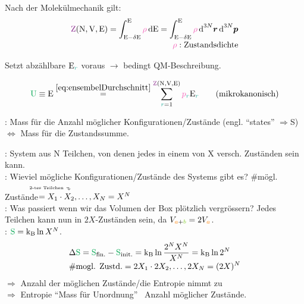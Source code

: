 \begin{emphbox}\nospacing
  \begin{law}
    Nach der Molekülmechanik gilt:
    \begin{align}
      \Zzm=\int_{\Ez-\delta\Ez}^{\Ez}\rhoc\diff\Ez=\int_{\Ez-\delta\Ez}^{\Ez}\rhoc\diff^{3N}\vec{r}\diff^{3N}\vec{p}\nalign
      \rhoc:\text{Zustandsdichte} \nonumber
    \end{align}
  \end{law}
\end{emphbox}
\begin{sectionbox}\nospacing
  \begin{numberlist}
      \item
  \begin{notebox}[Bemerkung]
    Setzt abzählbare $\Ezr$ voraus $\rightarrow$ bedingt QM-Beschreibung.
  \end{notebox}
  \begin{equation}
		\Upot\equiv\Ez\eqs{\cref{eq:ensembelDurchschnitt}}\sum_{\idxr=1}^{\Zzm}\pbr\Ezr\qquad(\text{mikrokanonisch})
  \end{equation}
    \item {}: Mass für die Anzahl möglicher Konfigurationen/Zustände (engl. ``states''
  $\Rightarrow$S) $\Leftrightarrow$ Mass für die Zustandssumme.
  \end{numberlist}
\end{sectionbox}
\begin{notebox}[Beispiel]\nospacing
  : System aus N Teilchen, von denen jedes in einem von X versch. Zuständen sein kann.\\
  : Wieviel mögliche Konfigurationen/Zustände des Systems gibt es? \#mögl. Zustände$=X_1\cdot\tdla{X_2}{\normalfont{2-tes Teilchen}},\ldots,X_N=X^N$\\
  : Was passiert wenn wir das Volumen der Box plötzlich vergrössern?
  Jedes Teilchen kann nun in $2X$-Zuständen sein, da $V_{\mca+\mcb}=2V_{\mca}$. \\
  : \hfil$\Spot=\kb\ln X^N$.
  \begin{align*}
    &\Delta\Spot=\Spot_{\text{fin.}}-\Spot_{\text{init.}}=\kb\ln\frac{2^N X^N}{X^N}=\kb\ln2^N \nalign
    &\#\text{mogl. Zustd.}=2X_1\cdot 2X_2,\ldots,2X_N=(2X)^N
  \end{align*}
  $\Rightarrow$ Anzahl der möglichen Zustände/die Entropie nimmt zu\\
  $\Rightarrow$ Entropie ``Mass für Unordnung''~ Anzahl möglicher Zustände.
\end{notebox}
